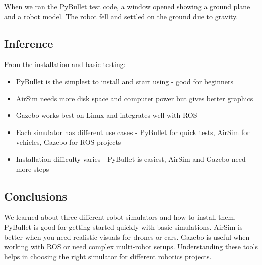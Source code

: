 When we ran the PyBullet test code, a window opened showing a ground plane and a robot model. The robot fell and settled on the ground due to gravity.

\subsection{Inference}

From the installation and basic testing:
\begin{itemize}
	\item PyBullet is the simplest to install and start using - good for beginners
	\item AirSim needs more disk space and computer power but gives better graphics
	\item Gazebo works best on Linux and integrates well with ROS
	\item Each simulator has different use cases - PyBullet for quick tests, AirSim for vehicles, Gazebo for ROS projects
	\item Installation difficulty varies - PyBullet is easiest, AirSim and Gazebo need more steps
\end{itemize}

\subsection{Conclusions}

We learned about three different robot simulators and how to install them. PyBullet is good for getting started quickly with basic simulations. AirSim is better when you need realistic visuals for drones or cars. Gazebo is useful when working with ROS or need complex multi-robot setups. Understanding these tools helps in choosing the right simulator for different robotics projects.

\clearpage